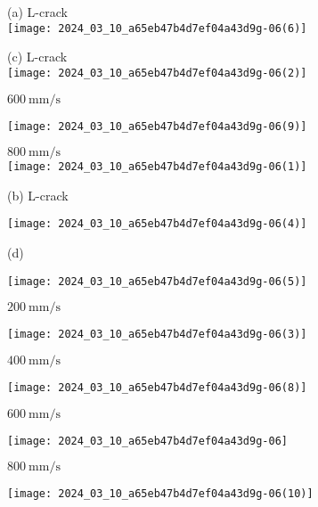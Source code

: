 \documentclass[10pt]{article}
\begin{document}
(a) L-crack\\
\texttt{[image: 2024\_03\_10\_a65eb47b4d7ef04a43d9g-06(6)]}

(c) L-crack\\
\texttt{[image: 2024\_03\_10\_a65eb47b4d7ef04a43d9g-06(2)]}

$600 \mathrm{~mm} / \mathrm{s}$

\begin{center}
\texttt{[image: 2024\_03\_10\_a65eb47b4d7ef04a43d9g-06(9)]}
\end{center}

$800 \mathrm{~mm} / \mathrm{s}$\\
\texttt{[image: 2024\_03\_10\_a65eb47b4d7ef04a43d9g-06(1)]}

(b) L-crack

\begin{center}
\texttt{[image: 2024\_03\_10\_a65eb47b4d7ef04a43d9g-06(4)]}
\end{center}

(d)

\begin{center}
\texttt{[image: 2024\_03\_10\_a65eb47b4d7ef04a43d9g-06(5)]}
\end{center}

$200 \mathrm{~mm} / \mathrm{s}$

\begin{center}
\texttt{[image: 2024\_03\_10\_a65eb47b4d7ef04a43d9g-06(3)]}
\end{center}

$400 \mathrm{~mm} / \mathrm{s}$

\begin{center}
\texttt{[image: 2024\_03\_10\_a65eb47b4d7ef04a43d9g-06(8)]}
\end{center}

$600 \mathrm{~mm} / \mathrm{s}$

\begin{center}
\texttt{[image: 2024\_03\_10\_a65eb47b4d7ef04a43d9g-06]}
\end{center}

$800 \mathrm{~mm} / \mathrm{s}$

\begin{center}
\texttt{[image: 2024\_03\_10\_a65eb47b4d7ef04a43d9g-06(10)]}
\end{center}
\end{document}
